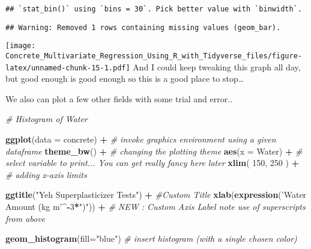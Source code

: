 \documentclass[]{article}
\newenvironment{Shaded}{\begin{snugshade}}{\end{snugshade}}
\newcommand{\CommentTok}[1]{\textcolor[rgb]{0.56,0.35,0.01}{\textit{#1}}}
\newcommand{\DataTypeTok}[1]{\textcolor[rgb]{0.13,0.29,0.53}{#1}}
\newcommand{\DecValTok}[1]{\textcolor[rgb]{0.00,0.00,0.81}{#1}}
\newcommand{\KeywordTok}[1]{\textcolor[rgb]{0.13,0.29,0.53}{\textbf{#1}}}
\newcommand{\NormalTok}[1]{#1}
\newcommand{\OperatorTok}[1]{\textcolor[rgb]{0.81,0.36,0.00}{\textbf{#1}}}
\newcommand{\StringTok}[1]{\textcolor[rgb]{0.31,0.60,0.02}{#1}}
\begin{document}
\begin{verbatim}
## `stat_bin()` using `bins = 30`. Pick better value with `binwidth`.
\end{verbatim}

\begin{verbatim}
## Warning: Removed 1 rows containing missing values (geom_bar).
\end{verbatim}

\texttt{[image: Concrete\_Multivariate\_Regression\_Using\_R\_with\_Tidyverse\_files/figure-latex/unnamed-chunk-15-1.pdf]}
And I could keep tweaking this graph all day, but good enough is good
enough so this is a good place to stop\ldots{}

We also can plot a few other fields with some trial and error..

\begin{Shaded}
\begin{Highlighting}[]
\CommentTok{# Histogram of Water}

\KeywordTok{ggplot}\NormalTok{(}\DataTypeTok{data =}\NormalTok{ concrete) }\OperatorTok{+}\StringTok{     }\CommentTok{# invoke graphics environment using a given dataframe}
\StringTok{  }
\StringTok{  }\KeywordTok{theme_bw}\NormalTok{() }\OperatorTok{+}\StringTok{                }\CommentTok{# changing the plotting theme}
\StringTok{  }
\StringTok{  }\KeywordTok{aes}\NormalTok{(}\DataTypeTok{x =}\NormalTok{ Water) }\OperatorTok{+}\StringTok{           }\CommentTok{# select variable to print... You can get really fancy here later}
\StringTok{  }
\StringTok{  }\KeywordTok{xlim}\NormalTok{( }\DecValTok{150}\NormalTok{, }\DecValTok{250}\NormalTok{ ) }\OperatorTok{+}\StringTok{          }\CommentTok{# adding x-axis limits}

\StringTok{  }\KeywordTok{ggtitle}\NormalTok{(}\StringTok{"Yeh Superplasticizer Tests"}\NormalTok{) }\OperatorTok{+}\StringTok{ }\CommentTok{#Custom Title}
\StringTok{  }
\StringTok{  }\KeywordTok{xlab}\NormalTok{(}\KeywordTok{expression}\NormalTok{(}\StringTok{'Water Amount (kg m'}\OperatorTok{^-}\DecValTok{3}\OperatorTok{*}\StringTok{")"}\NormalTok{)) }\OperatorTok{+}\StringTok{ }\CommentTok{# NEW : Custom Axis Label note use of superscripts from above}

\StringTok{  }\KeywordTok{geom_histogram}\NormalTok{(}\DataTypeTok{fill=}\StringTok{"blue"}\NormalTok{) }\CommentTok{# insert histogram (with a single chosen color)}
\end{Highlighting}
\end{Shaded}
\end{document}

